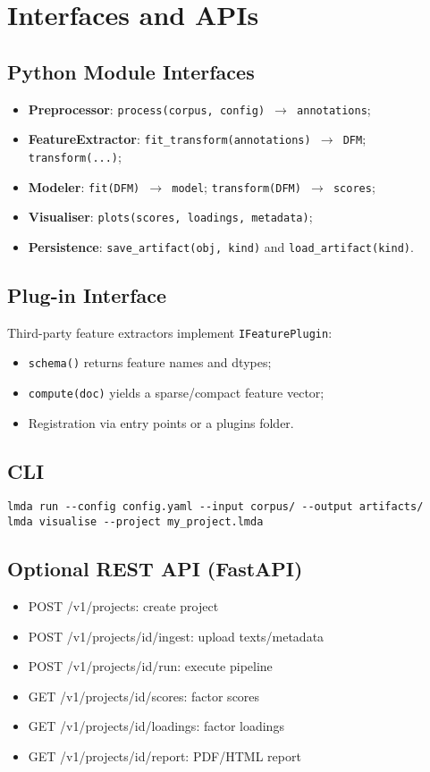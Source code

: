 \section{Interfaces and APIs}
\subsection{Python Module Interfaces}
\begin{itemize}
    \item \textbf{Preprocessor}: \texttt{process(corpus, config) $\rightarrow$ annotations};
    \item \textbf{FeatureExtractor}: \texttt{fit\_transform(annotations) $\rightarrow$ DFM}; \texttt{transform(...)};
    \item \textbf{Modeler}: \texttt{fit(DFM) $\rightarrow$ model}; \texttt{transform(DFM) $\rightarrow$ scores};
    \item \textbf{Visualiser}: \texttt{plots(scores, loadings, metadata)};
    \item \textbf{Persistence}: \texttt{save\_artifact(obj, kind)} and \texttt{load\_artifact(kind)}.
\end{itemize}

\subsection{Plug-in Interface}
Third-party feature extractors implement \texttt{IFeaturePlugin}:
\begin{itemize}
    \item \texttt{schema()} returns feature names and dtypes;
    \item \texttt{compute(doc)} yields a sparse/compact feature vector;
    \item Registration via entry points or a plugins folder.
\end{itemize}

\subsection{CLI}
\begin{verbatim}
lmda run --config config.yaml --input corpus/ --output artifacts/
lmda visualise --project my_project.lmda
\end{verbatim}

\subsection{Optional REST API (FastAPI)}
\begin{itemize}
    \item POST /v1/projects: create project
    \item POST /v1/projects/{id}/ingest: upload texts/metadata
    \item POST /v1/projects/{id}/run: execute pipeline
    \item GET /v1/projects/{id}/scores: factor scores
    \item GET /v1/projects/{id}/loadings: factor loadings
    \item GET /v1/projects/{id}/report: PDF/HTML report
\end{itemize}

